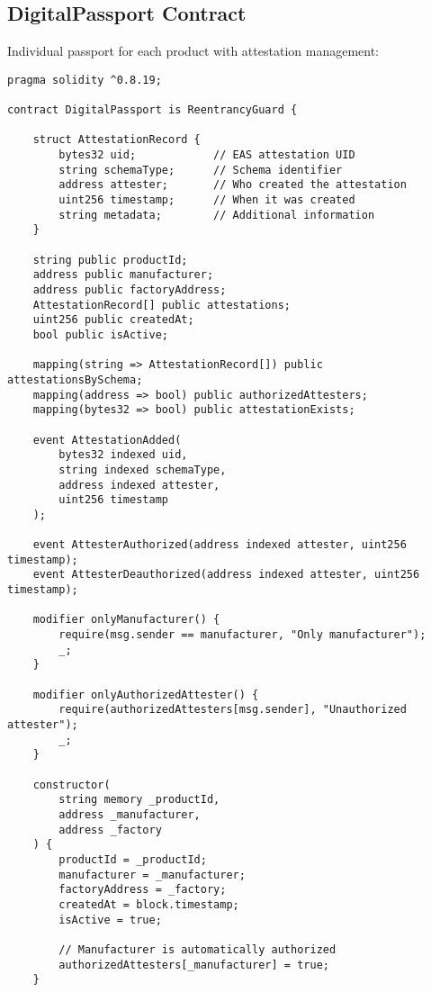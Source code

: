 \documentclass[11pt,a4paper]{article}
\begin{document}
\subsection{DigitalPassport Contract}

Individual passport for each product with attestation management:

\begin{verbatim}
pragma solidity ^0.8.19;

contract DigitalPassport is ReentrancyGuard {
    
    struct AttestationRecord {
        bytes32 uid;            // EAS attestation UID
        string schemaType;      // Schema identifier
        address attester;       // Who created the attestation
        uint256 timestamp;      // When it was created
        string metadata;        // Additional information
    }
    
    string public productId;
    address public manufacturer;
    address public factoryAddress;
    AttestationRecord[] public attestations;
    uint256 public createdAt;
    bool public isActive;
    
    mapping(string => AttestationRecord[]) public attestationsBySchema;
    mapping(address => bool) public authorizedAttesters;
    mapping(bytes32 => bool) public attestationExists;
    
    event AttestationAdded(
        bytes32 indexed uid,
        string indexed schemaType,
        address indexed attester,
        uint256 timestamp
    );
    
    event AttesterAuthorized(address indexed attester, uint256 timestamp);
    event AttesterDeauthorized(address indexed attester, uint256 timestamp);
    
    modifier onlyManufacturer() {
        require(msg.sender == manufacturer, "Only manufacturer");
        _;
    }
    
    modifier onlyAuthorizedAttester() {
        require(authorizedAttesters[msg.sender], "Unauthorized attester");
        _;
    }
    
    constructor(
        string memory _productId,
        address _manufacturer,
        address _factory
    ) {
        productId = _productId;
        manufacturer = _manufacturer;
        factoryAddress = _factory;
        createdAt = block.timestamp;
        isActive = true;
        
        // Manufacturer is automatically authorized
        authorizedAttesters[_manufacturer] = true;
    }
    

\end{verbatim}
\end{document}
